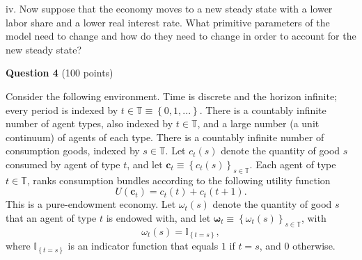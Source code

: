 \documentclass[11pt]{article}
\begin{document}
iv. Now suppose that the economy moves to a new steady state with a lower
labor share and a lower real interest rate. What primitive parameters of the
model need to change and how do they need to change in order to account for
the new steady state?


\newpage



\noindent \textbf{Question 4} (100 points)\medskip

\noindent Consider the following environment. Time is
discrete and the horizon infinite; every period is indexed by $t\in \mathbb{T%
}\equiv \left\{ 0,1,...\right\} $. There is a countably infinite number of
agent types, also indexed by $t\in \mathbb{T}$, and a large number (a unit
continuum) of agents of each type. There is a countably infinite number of
consumption goods, indexed by $s\in \mathbb{T}$. Let $c_{t}\left( s\right) $
denote the quantity of good $s$ consumed by agent of type $t$, and let $%
\boldsymbol{c}_{t}\equiv \left\{ c_{t}\left( s\right) \right\} _{s\in
\mathbb{T}}$. Each agent of type $t\in \mathbb{T}$, ranks consumption
bundles according to the following utility function
\begin{equation*}
U\left( \boldsymbol{c}_{t}\right) =c_{t}\left( t\right) +c_{t}\left(
t+1\right) .
\end{equation*}%
This is a pure-endowment economy. Let $\omega _{t}\left( s\right) $ denote
the quantity of good $s$ that an agent of type $t$ is endowed with, and let $%
\boldsymbol{\omega }_{t}\equiv \left\{ \omega _{t}\left( s\right) \right\}
_{s\in \mathbb{T}}$, with%
\begin{equation*}
\omega _{t}\left( s\right) =\mathbb{I}_{\left\{ t=s\right\} },
\end{equation*}%
where $\mathbb{I}_{\left\{ t=s\right\} }$ is an indicator function that
equals $1$ if $t=s$, and $0$ otherwise.
\end{document}
